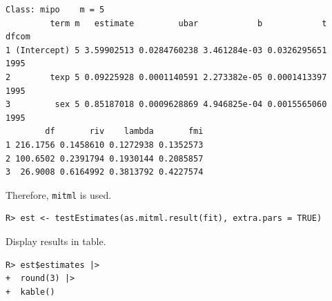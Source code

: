 \documentclass[
  article]{jss}
\begin{document}
\begin{verbatim}
Class: mipo    m = 5 
         term m   estimate         ubar            b            t dfcom
1 (Intercept) 5 3.59902513 0.0284760238 3.461284e-03 0.0326295651  1995
2        texp 5 0.09225928 0.0001140591 2.273382e-05 0.0001413397  1995
3         sex 5 0.85187018 0.0009628869 4.946825e-04 0.0015565060  1995
        df       riv    lambda       fmi
1 216.1756 0.1458610 0.1272938 0.1352573
2 100.6502 0.2391794 0.1930144 0.2085857
3  26.9008 0.6164992 0.3813792 0.4227574
\end{verbatim}

Therefore, \texttt{mitml} is used.

\begin{verbatim}
R> est <- testEstimates(as.mitml.result(fit), extra.pars = TRUE)
\end{verbatim}

Display results in table.

\begin{verbatim}
R> est$estimates |> 
+  round(3) |>
+  kable()
\end{verbatim}
\end{document}
